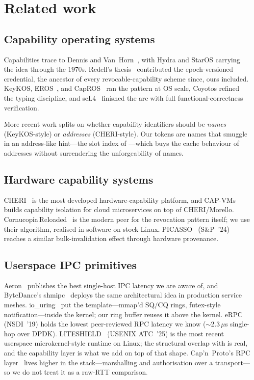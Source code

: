 \section{Related work}
\label{sec:rw}

\subsection{Capability operating systems}

Capabilities trace to Dennis and Van~Horn~\cite{dennis1966}, with
Hydra and StarOS carrying the idea through the 1970s. Redell's
thesis~\cite{redell74} contributed the epoch-versioned credential,
the ancestor of every revocable-capability scheme since, ours
included. KeyKOS, EROS~\cite{shapiro1999eros}, and
CapROS~\cite{capros} ran the pattern at OS scale, Coyotos refined the
typing discipline, and seL4~\cite{klein2009sel4} finished the arc
with full functional-correctness verification.

More recent work splits on whether capability identifiers should be
\textit{names} (KeyKOS-style) or \textit{addresses} (CHERI-style).
Our tokens are names that smuggle in an address-like hint---the slot
index of ---which buys the cache behaviour
of addresses without surrendering the unforgeability of names.

\subsection{Hardware capability systems}

CHERI~\cite{cheri-asplos15,cheri-tcg22} is the most developed
hardware-capability platform, and CAP-VMs~\cite{capvms} builds
capability isolation for cloud microservices on top of
CHERI/Morello. Cornucopia\,Reloaded~\cite{cornucopia-reloaded} is the
modern peer for the revocation pattern itself; we use their
algorithm, realised in software on stock Linux.
PICASSO~\cite{picasso} (S\&P~'24) reaches a similar bulk-invalidation
effect through hardware provenance.

\subsection{Userspace IPC primitives}

Aeron~\cite{aeron-real-logic} publishes the best single-host IPC
latency we are aware of, and ByteDance's
shmipc~\cite{bytedance-shmipc} deploys the same architectural idea in
production service meshes. io\_uring~\cite{iouring} put the
template---mmap'd SQ/CQ rings, futex-style notification---inside the
kernel; our ring buffer reuses it above the kernel. eRPC~\cite{erpc}
(NSDI~'19) holds the lowest peer-reviewed RPC latency we know
($\sim$2.3\,$\mu$s single-hop over DPDK).
LITESHIELD~\cite{liteshield} (USENIX ATC~'25) is the most recent
userspace microkernel-style runtime on Linux; the structural overlap
with \sysname is real, and the capability layer is what we add on
top of that shape. Cap'n~Proto's RPC layer~\cite{capnproto-rpc}
lives higher in the stack---marshalling and authorisation over a
transport---so we do not treat it as a raw-RTT comparison.

